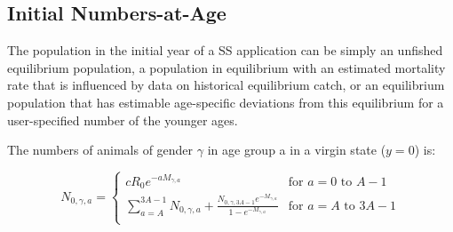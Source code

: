 \documentclass[11pt,
  english,
  letterpaper,
]{article}
\begin{document}
\leavevmode\tagmcend\tagstructend\par


\hypertarget{initial-numbers-at-age}{%
\subsection{Initial Numbers-at-Age}\label{initial-numbers-at-age}}

\leavevmode\tagmcend\tagstructend


The population in the initial year of a SS application can be simply an unfished equilibrium population, a population in equilibrium with an estimated mortality rate that is influenced by data on historical equilibrium catch, or an equilibrium population that has estimable age-specific deviations from this equilibrium for a user-specified number of the younger ages.

\leavevmode\tagmcend\tagstructend\par


The numbers of animals of gender {\(\gamma\)\leavevmode\tagmcend\tagstructend} in age group a in a virgin state ({\(y=0\)\leavevmode\tagmcend\tagstructend}) is:

\leavevmode\tagmcend\tagstructend\par


\begin{equation}
\label{eqn1}
N_{0,\gamma,a} =
\begin{cases}
cR_0e^{-aM_{\gamma,a}} & \text{for $a=0$ to $A-1$} \\
\sum_{a=A}^{3A-1}N_{0,\gamma,a} + \frac{N_{0,\gamma,3A-1}e^{-M_{\gamma,a}}}{1-e^{-M_{\gamma,a}}} & \text{for $a=A$ to $3A-1$}\\
\end{cases}
\end{equation}

\leavevmode\tagmcend\tagstructend\par

\end{document}
